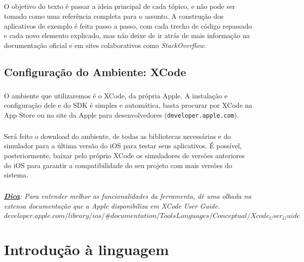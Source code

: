 \documentclass[a4paper,12pt,brazil,doubleside]{book}
\begin{document}
\paragraph{}O objetivo do texto é passar a ideia principal de cada tópico, e não pode ser tomado como uma referência completa para o assunto. A construção dos aplicativos de exemplo é feita passo a passo, com cada trecho de código repassado e cada novo elemento explicado, mas não deixe de ir atrás de mais informação na documentação oficial e em sites colaborativos como \emph{StackOverflow}.

\bigskip
\bigskip

\section{Configuração do Ambiente: XCode}

\paragraph{}O ambiente que utilizaremos é o XCode, da própria Apple. A instalação e configuração dele e do SDK é simples e automática, basta procurar por XCode na App Store ou no site da Apple para desenvolvedores (\texttt{developer.apple.com}).
\paragraph{}Será feito o download do ambiente, de todas as bibliotecas necessárias e do simulador para a última versão do iOS para testar seus aplicativos. É possível, posteriormente, baixar pelo próprio XCode os simuladores de versões anteriores do iOS para garantir a compatibilidade do seu projeto com mais versões do sistema.\\

\paragraph{}\textit{\textbf{\underline{Dica}}: Para entender melhor as funcionalidades da ferramenta, dê uma olhada na extensa documentação que a Apple disponibiliza em 
XCode User Guide.\\
\(developer.apple.com/library/ios/\#documentation/ToolsLanguages/Conceptual/Xcode_User_Guide\)}

\chapter{Introdução à linguagem}
\end{document}
